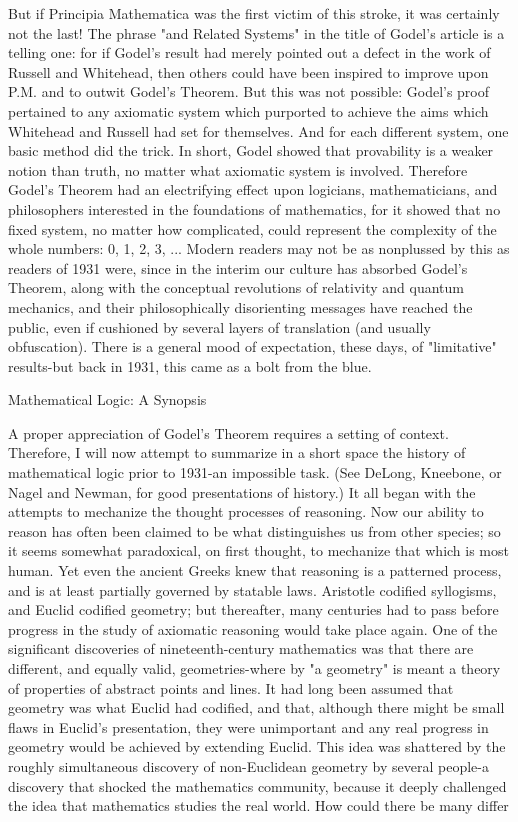 But if Principia Mathematica was the first victim of this stroke, it was certainly not the last! The phrase "and Related Systems" in the title of Godel's article is a telling one: for if Godel's result had merely pointed out a defect in the work of Russell and Whitehead, then others could have been inspired to improve upon P.M. and to outwit Godel's Theorem. But this was not possible: Godel's proof pertained to any axiomatic system which purported to achieve the aims which Whitehead and Russell had set for themselves. And for each different system, one basic method did the trick. In short, Godel showed that provability is a weaker notion than truth, no matter what axiomatic system is involved. Therefore Godel's Theorem had an electrifying effect upon logicians, mathematicians, and philosophers interested in the foundations of mathematics, for it showed that no fixed system, no matter how complicated, could represent the complexity of the whole numbers: 0, 1, 2, 3, ... Modern readers may not be as nonplussed by this as readers of 1931 were, since in the interim our culture has absorbed Godel's Theorem, along with the conceptual revolutions of relativity and quantum mechanics, and their philosophically disorienting messages have reached the public, even if cushioned by several layers of translation (and usually obfuscation). There is a general mood of expectation, these days, of "limitative" results-but back in 1931, this came as a bolt from the blue. 

Mathematical Logic: A Synopsis 

A proper appreciation of Godel's Theorem requires a setting of context. Therefore, I will now attempt to summarize in a short space the history of mathematical logic prior to 1931-an impossible task. (See DeLong, Kneebone, or Nagel and Newman, for good presentations of history.) It all began with the attempts to mechanize the thought processes of reasoning. Now our ability to reason has often been claimed to be what distinguishes us from other species; so it seems somewhat paradoxical, on first thought, to mechanize that which is most human. Yet even the ancient Greeks knew that reasoning is a patterned process, and is at least partially governed by statable laws. Aristotle codified syllogisms, and Euclid codified geometry; but thereafter, many centuries had to pass before progress in the study of axiomatic reasoning would take place again. One of the significant discoveries of nineteenth-century mathematics was that there are different, and equally valid, geometries-where by "a geometry" is meant a theory of properties of abstract points and lines. It had long been assumed that geometry was what Euclid had codified, and that, although there might be small flaws in Euclid's presentation, they were unimportant and any real progress in geometry would be achieved by extending Euclid. This idea was shattered by the roughly simultaneous discovery of non-Euclidean geometry by several people-a discovery that shocked the mathematics community, because it deeply challenged the idea that mathematics studies the real world. How could there be many differ 







